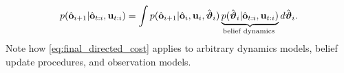 \begin{equation}
\label{eq:obs_marginal}
    p(\hat{\mathbf{o}}_{i+1} | \hat{\mathbf{o}}_{t:i}, \mathbf{u}_{t:i}) = \int p(\hat{\mathbf{o}}_{i+1} | \hat{\mathbf{o}}_i, \mathbf{u}_i, \hat{\boldsymbol{{\vartheta}}}_{i}) \underbrace{p(\hat{\boldsymbol{{\vartheta}}}_{i}|\hat{\mathbf{o}}_{t:i}, \mathbf{u}_{t:i})}_{\textrm{belief dynamics }}d\hat{\boldsymbol{{\vartheta}}}_{i}.
\end{equation}
Note how \eqref{eq:final_directed_cost} applies to arbitrary dynamics models, belief update procedures, and observation models. 




